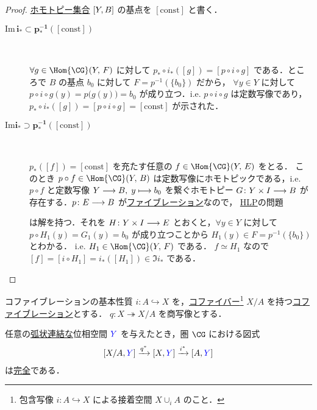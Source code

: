 \documentclass[algtopo_main]{subfiles}
\begin{document}
\begin{proof}
    \hyperref[def:homotopy-set]{ホモトピー集合} $\comm{Y}{B}$ の基点を $[\mathrm{const}]$ と書く．
    \begin{description}
        \item[\textbf{$\bm{\mathrm{Im}\, i_* \subset p_*^{-1}([\mathrm{const}])}$}] 　
        
        $\forall g \in \Hom{\CG} (Y,\, F)$ に対して 
        $p_* \circ i_* ([g]) = [p \circ i \circ g]$ である．ところで $B$ の基点 $b_0$ に対して $F = p^{-1}(\{b_0\})$ だから，
        $\forall y \in Y$ に対して $p \circ i \circ g(y) = p \bigl( g(y) \bigr) = b_0$ が成り立つ．i.e. $p \circ i \circ g$ は定数写像であり，$p_* \circ i_* ([g]) = [p \circ i \circ g] = [\mathrm{const}]$ が示された．
        
        \item[\textbf{$\bm{\mathrm{Im} i_* \supset p_*^{-1}([\mathrm{const}])}$}] 　
        
        $p_*([f]) = [\mathrm{const}]$ を充たす任意の $f \in \Hom{\CG}(Y,\, E)$ をとる．
        このとき $p \circ f \in \Hom{\CG}(Y,\, B)$ は定数写像にホモトピックである，i.e.
        $p \circ f$ と定数写像 $Y \longrightarrow B,\; y \longmapsto b_0$ を繋ぐホモトピー $G \colon Y \times I \longrightarrow B$ が存在する．$p \colon E \longrightarrow B$ が\hyperref[def:fibration]{ファイブレーション}なので，
        \hyperref[def:HLP]{HLP}の問題
        \begin{center}
        \end{center}
        は解を持つ．それを $H \colon Y \times I \longrightarrow E$ とおくと，$\forall y \in Y$ に対して $p \circ H_1(y) = G_1(y) = b_0$ が成り立つことから $H_1(y) \in F = p^{-1}(\{b_0\})$ とわかる．
        i.e. $H_1 \in \Hom{\CG} (Y,\, F)$ である．
        $f \simeq H_1$ なので $[f] = [i \circ H_1] = i_*([H_1]) \in \Im i_*$ である．
    \end{description}
\end{proof}

\begin{mytheo}[label=thm:cofib-basic]{コファイブレーションの基本性質}
    $i \colon A \hookrightarrow X$ を，\hyperref[thm:continuous-cofibration]{コファイバー}\footnote{包含写像 $i \colon A \hookrightarrow X$ による接着空間 $X \cup_i A$ のこと．} $X/A$ を持つ\hyperref[def:cofibration]{コファイブレーション}とする．
    $q \colon X \twoheadrightarrow X/A$ を商写像とする．

    任意の\underline{弧状連結な}位相空間 $\textcolor{blue}{Y}$ を与えたとき，圏 $\CG$ における図式
    \begin{align}
        \comm{X/A}{\textcolor{blue}{Y}} \xrightarrow{q^*} \comm{X}{\textcolor{blue}{Y}} \xrightarrow{i^*} \comm{A}{\textcolor{blue}{Y}}
    \end{align}
    は\hyperref[def:ES-SETS]{完全}である．
\end{mytheo}
\end{document}
